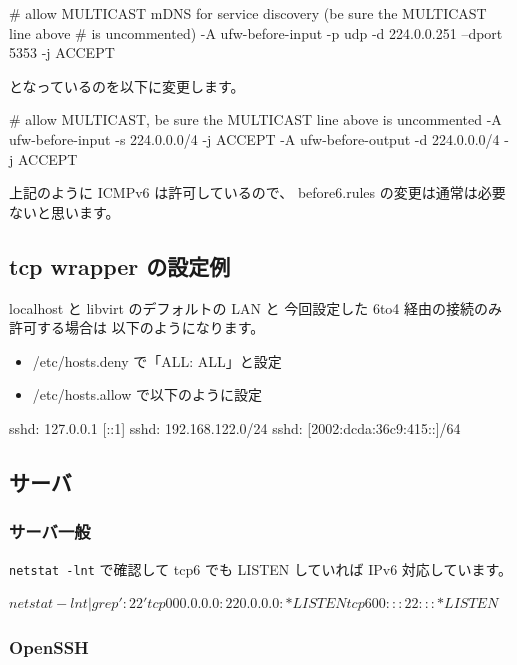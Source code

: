 \documentclass[mingoth,a4paper]{jsarticle}
\begin{document}
\begin{commandline}
# allow MULTICAST mDNS for service discovery (be sure the MULTICAST line above
# is uncommented)
-A ufw-before-input -p udp -d 224.0.0.251 --dport 5353 -j ACCEPT
\end{commandline}

となっているのを以下に変更します。

\begin{commandline}
# allow MULTICAST, be sure the MULTICAST line above is uncommented
-A ufw-before-input -s 224.0.0.0/4 -j ACCEPT
-A ufw-before-output -d 224.0.0.0/4 -j ACCEPT
\end{commandline}

上記のように ICMPv6 は許可しているので、
before6.rules の変更は通常は必要ないと思います。
\subsection{tcp wrapper の設定例}

localhost と libvirt のデフォルトの LAN と
今回設定した 6to4 経由の接続のみ許可する場合は
以下のようになります。

\begin{itemize}
\item /etc/hosts.deny で「ALL: ALL」と設定
\item /etc/hosts.allow で以下のように設定
\end{itemize}


\begin{commandline}
sshd: 127.0.0.1 [::1]
sshd: 192.168.122.0/24
sshd: [2002:dcda:36c9:415::]/64
\end{commandline}
\subsection{サーバ}
\subsubsection{サーバ一般}

\texttt{netstat -lnt} で確認して tcp6 でも LISTEN していれば IPv6 対応しています。

\begin{commandline}
$ netstat -lnt | grep ':22 '
tcp        0      0 0.0.0.0:22              0.0.0.0:*               LISTEN
tcp6       0      0 :::22                   :::*                    LISTEN
$
\end{commandline}
\subsubsection{OpenSSH}
\end{document}
